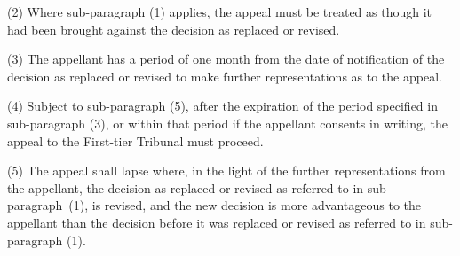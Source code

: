 \documentclass[12pt,a4paper]{article}
\begin{document}
(2) Where sub-paragraph (1) applies, the appeal must be treated as though it had been brought against the decision as replaced or revised.

(3) The appellant has a period of one month from the date of notification of the decision as replaced or revised to make further representations as to the appeal.

(4) Subject to sub-paragraph (5), after the expiration of the period specified in sub-paragraph (3), or within that period if the appellant consents in writing, the appeal to the First-tier Tribunal must proceed.

(5) The appeal shall lapse where, in the light of the further representations from the appellant, the decision as replaced or revised as referred to in sub-paragraph~(1), is revised, and the new decision is more advantageous to the appellant than the decision before it was replaced or revised as referred to in sub-paragraph (1).

\end{document}
